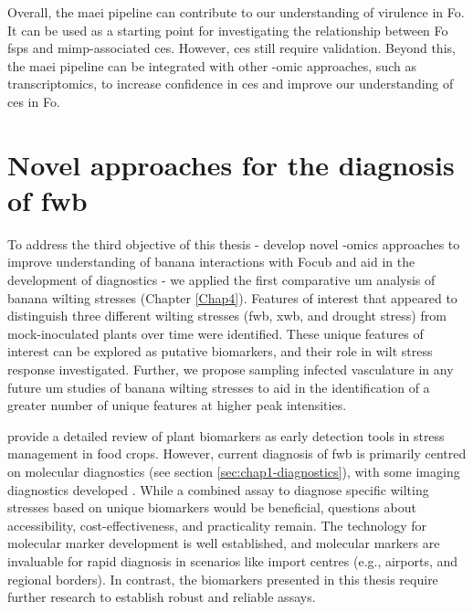 Overall, the \ac{maei} pipeline can contribute to our understanding of virulence in \ac{Fo}. It can be used as a starting point for investigating the relationship between \ac{Fo} \acp{fsp} and \ac{mimp}-associated \acp{ce}. However, \acp{ce} still require validation. Beyond this, the \ac{maei} pipeline can be integrated with other -omic approaches, such as transcriptomics, to increase confidence in \acp{ce} and improve our understanding of \acp{ce} in \ac{Fo}. 

\section{Novel approaches for the diagnosis of \acl{fwb}}

To address the third objective of this thesis - develop novel -omics approaches to improve understanding of banana interactions with \ac{Focub} and aid in the development of diagnostics - we applied the first comparative \acf{um} analysis of banana wilting stresses (Chapter \ref{Chap4}). Features of interest that appeared to distinguish three different wilting stresses (\acf{fwb}, \acf{xwb}, and drought stress) from mock-inoculated plants over time were identified. These unique features of interest can be explored as putative biomarkers, and their role in wilt stress response investigated. Further, we propose sampling infected vasculature in any future \ac{um} studies of banana wilting stresses to aid in the identification of a greater number of unique features at higher peak intensities. 

\textcite{Aina2024} provide a detailed review of plant biomarkers as early detection tools in stress management in food crops. However, current diagnosis of \ac{fwb} is primarily centred on molecular diagnostics (see section \ref{sec:chap1-diagnostics}), with some imaging diagnostics developed \parencite{Ye2020a, Ye2020b, Selvaraj2019b, Zhang2022}. While a combined assay to diagnose specific wilting stresses based on unique biomarkers would be beneficial, questions about accessibility, cost-effectiveness, and practicality remain. The technology for molecular marker development is well established, and molecular markers are invaluable for rapid diagnosis in scenarios like import centres (e.g., airports, and regional borders). In contrast, the biomarkers presented in this thesis require further research to establish robust and reliable assays.

